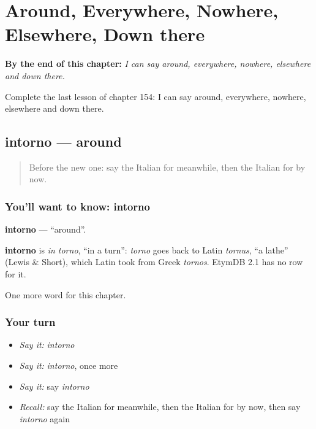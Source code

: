 
\chapter{Around, Everywhere, Nowhere, Elsewhere, Down there}
\label{ch:it-around-everywhere-nowhere-elsewhere-down-there}

\begin{chapteropening}
\textbf{By the end of this chapter:} \emph{I can say around, everywhere, nowhere, elsewhere and down there.}

Complete the last lesson of chapter 154: I can say around, everywhere, nowhere, elsewhere and down there.
\end{chapteropening}

\section[intorno]{intorno — around}

\label{lesson:IT-C154-intorno}



\begin{quote}
Before the new one: say the Italian for meanwhile, then the Italian for by now.
\end{quote}

\subsection*{You'll want to know: intorno}
\textbf{intorno} — \textquotedblleft{}around\textquotedblright{}.

\begin{cousinweb}
\textbf{intorno} is \emph{in torno}, \textquotedblleft{}in a turn\textquotedblright{}: \emph{torno} goes back to Latin \emph{tornus}, \textquotedblleft{}a lathe\textquotedblright{} (Lewis \& Short), which Latin took from Greek \emph{tornos}. EtymDB 2.1 has no row for it.
\end{cousinweb}

\begin{grammarlens}[title={What you've built}]
One more word for this chapter.
\end{grammarlens}

\subsection*{Your turn}
\begin{itemize}
\raggedright
  \item \emph{Say it:} \emph{intorno}
  \item \emph{Say it:} \emph{intorno}, once more
  \item \emph{Say it:} say \emph{intorno}
  \item \emph{Recall:} say the Italian for meanwhile, then the Italian for by now, then say \emph{intorno} again
\end{itemize}

